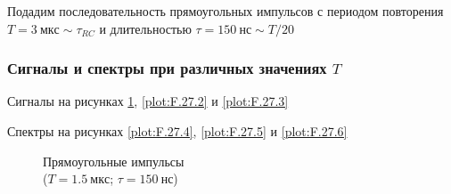 \documentclass[a4paper, 12pt]{article}
\begin{document}
                Подадим последовательность прямоугольных импульсов с периодом повторения $T = 3~мкс \sim \tau_{RC}$ и длительностью $\tau = 150~нс \sim T/20$

            \subsubsection{Сигналы и спектры при различных значениях $T$}

                Сигналы на рисунках \ref{plot:F.27.1}, \ref{plot:F.27.2} и \ref{plot:F.27.3}

                Спектры на рисунках \ref{plot:F.27.4}, \ref{plot:F.27.5} и \ref{plot:F.27.6}

                \begin{figure}[ht]
                    \begin{minipage}[ht]{0.49\linewidth}
                        \caption{Прямоугольные импульсы\\($T = 1.5~мкс$; $\tau = 150~нс$)}
                        \label{plot:F.27.1}
                    \end{minipage}
                    \begin{minipage}[ht]{0.49\linewidth}

\end{minipage}
\end{figure}
\end{document}
